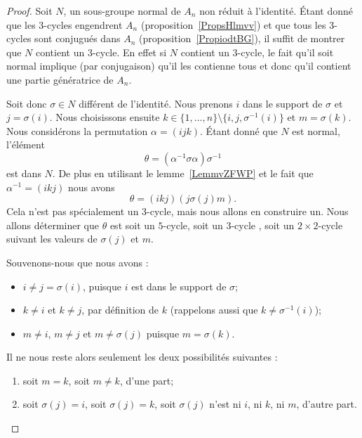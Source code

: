 \begin{proof}
	Soit \( N\), un sous-groupe normal de \( A_n\) non réduit à l'identité. Étant donné que les \( 3\)-cycles engendrent \( A_n\) (proposition~\ref{PropsHlmvv}) et que tous les \( 3\)-cycles sont conjugués dans \( A_n\) (proposition~\ref{PropiodtBG}), il suffit de montrer que \( N\) contient un \( 3\)-cycle. En effet si \( N\) contient un \( 3\)-cycle, le fait qu'il soit normal implique (par conjugaison) qu'il les contienne tous et donc qu'il contient une partie génératrice de \( A_n\).

	Soit donc \( \sigma\in N\) différent de l'identité. Nous prenons \( i\) dans le support de \( \sigma\) et \( j=\sigma(i)\). Nous choisissons ensuite \( k\in\{ 1,\ldots, n \}\setminus\{ i,j,\sigma^{-1}(i) \}\) et \( m=\sigma(k)\). Nous considérons la permutation \( \alpha=(ijk)\). Étant donné que \( N\) est normal, l'élément
	\begin{equation}
		\theta=(\alpha^{-1}\sigma\alpha)\sigma^{-1}
	\end{equation}
	est dans \( N\). De plus en utilisant le lemme~\ref{LemmvZFWP} et le fait que \( \alpha^{-1}=(ikj)\) nous avons
	\begin{equation}
		\theta=(ikj)(j\sigma(j)m).
	\end{equation}
	Cela n'est pas spécialement un \( 3\)-cycle, mais nous allons en construire un. Nous allons déterminer que \( \theta\) est soit un \( 5\)-cycle, soit un \( 3\)-cycle , soit un \( 2\times 2\)-cycle suivant les valeurs de \( \sigma(j)\) et \( m\).

	Souvenons-nous que nous avons :
	\begin{itemize}
		\item
		      \( i \neq j = \sigma(i) \), puisque $i$ est dans le support de \( \sigma \);
		\item
		      \( k \neq i \) et \( k \neq j \), par définition de $k$ (rappelons aussi que \( k \neq \sigma^{-1}(i) \));
		\item
		      \( m \neq i \), \( m \neq j \) et \( m \neq  \sigma(j) \) puisque \( m = \sigma(k) \).
	\end{itemize}
	Il ne nous reste alors seulement les deux possibilités suivantes :
	\begin{enumerate}
		\item
		      soit \( m=k\), soit \( m \neq k \), d'une part;
		\item
		      soit \( \sigma(j) = i \), soit \( \sigma(j) = k \), soit \( \sigma(j) \) n'est ni $i$, ni $k$, ni $m$, d'autre part.
	\end{enumerate}


\end{proof}

